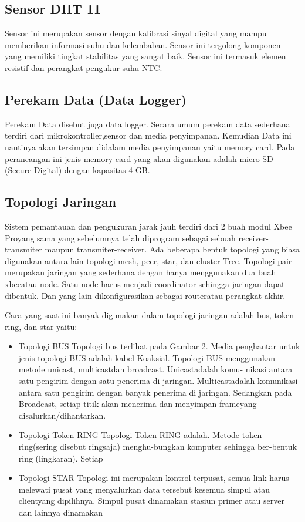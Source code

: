 \subsection{Sensor DHT 11}
Sensor ini merupakan sensor dengan kalibrasi sinyal digital yang mampu memberikan informasi suhu dan kelembaban. Sensor ini tergolong komponen yang memiliki tingkat stabilitas yang sangat baik. Sensor ini termasuk elemen resistif dan perangkat pengukur suhu NTC.

\subsection{Perekam Data (Data Logger)}
Perekam Data disebut juga data logger. Secara umum perekam data sederhana terdiri dari mikrokontroller,sensor dan media penyimpanan. Kemudian Data ini nantinya akan
tersimpan didalam media penyimpanan yaitu memory card. Pada perancangan ini jenis memory card yang akan digunakan adalah micro SD 
(Secure Digital) dengan kapasitas 4 GB.

\subsection{Topologi Jaringan}
Sistem pemantauan dan pengukuran jarak jauh terdiri dari 2 buah modul 
Xbee Proyang sama yang sebelumnya telah diprogram sebagai sebuah receiver-transmiter maupun transmiter-receiver. Ada beberapa bentuk topologi yang biasa digunakan antara lain topologi mesh, peer, star, dan cluster Tree.
Topologi pair merupakan jaringan yang sederhana dengan hanya menggunakan dua buah xbeeatau node. Satu node harus menjadi coordinator sehingga jaringan dapat dibentuk. Dan yang lain dikonfigurasikan sebagai routeratau perangkat akhir.

Cara yang saat ini banyak digunakan  dalam topologi jaringan adalah bus, token ring, dan star yaitu:
\begin{itemize}
\item Topologi BUS 
Topologi bus terlihat pada Gambar 2. Media penghantar untuk jenis topologi BUS adalah kabel Koaksial. Topologi BUS menggunakan metode unicast, multicastdan broadcast. Unicastadalah komu- nikasi antara satu pengirim 
dengan satu penerima di jaringan. Multicastadalah komunikasi antara satu pengirim dengan banyak penerima di jaringan. Sedangkan pada Broadcast, setiap titik akan menerima dan menyimpan frameyang disalurkan/dihantarkan.

\item Topologi Token RING 
Topologi Token RING adalah. Metode token-ring(sering disebut ringsaja) menghu-bungkan komputer sehingga ber-bentuk ring (lingkaran). Setiap 

\item Topologi STAR 
Topologi ini merupakan kontrol terpusat, semua link harus melewati pusat yang menyalurkan data tersebut kesemua simpul atau clientyang dipilihnya. Simpul pusat dinamakan stasiun primer atau 
server dan lainnya dinamakan 

\end{itemize}
